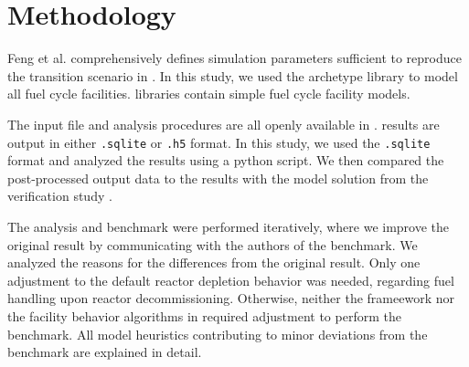 \section{Methodology}

Feng et al. comprehensively defines simulation parameters
sufficient to reproduce the transition scenario in \Cyclus.
In this study, we used the \Cycamore \cite{huff_fundamental_2016}
 archetype library to model
all fuel cycle facilities. \Cycamore libraries contain
simple fuel cycle facility models. 

The \Cyclus input file and analysis procedures are all
openly available in \cite{bae_arfc/transition-scenarios:_2018}.
\Cyclus results are output in either \texttt{.sqlite} or
\texttt{.h5} format. In this study, we used the
\texttt{.sqlite} format and analyzed the results
using a python script. We then compared the post-processed
output data to the results with the
model solution from the verification study \cite{feng_standardized_2016}.

The analysis and benchmark were performed iteratively,
where we improve the original result by communicating
with the authors of the benchmark. 
We analyzed the reasons for the differences from the original
result. Only one adjustment to the default \Cycamore reactor depletion behavior 
was needed, regarding fuel handling upon reactor decommissioning.
Otherwise, neither the \Cyclus frameework nor the facility behavior algorithms 
in \Cycamore required adjustment to perform the benchmark. All model heuristics 
contributing to minor deviations from the benchmark are explained in detail.
